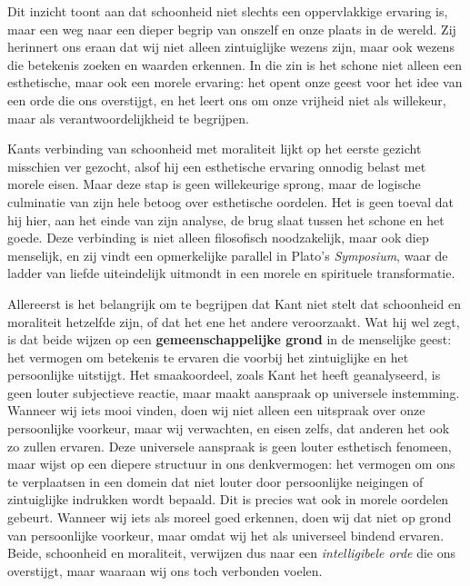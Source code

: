 \begin{mdframed}[leftmargin=0pt,rightmargin=0pt,backgroundcolor=blue!6,linecolor=white,innertopmargin=6pt,innerbottommargin=6pt]
Dit inzicht toont aan dat schoonheid niet slechts een oppervlakkige ervaring is, maar een weg naar een dieper begrip van onszelf en onze plaats in de wereld. Zij herinnert ons eraan dat wij niet alleen zintuiglijke wezens zijn, maar ook wezens die betekenis zoeken en waarden erkennen. In die zin is het schone niet alleen een esthetische, maar ook een morele ervaring: het opent onze geest voor het idee van een orde die ons overstijgt, en het leert ons om onze vrijheid niet als willekeur, maar als verantwoordelijkheid te begrijpen.

\bigskip
Kants verbinding van schoonheid met moraliteit lijkt op het eerste gezicht misschien ver gezocht, alsof hij een esthetische ervaring onnodig belast met morele eisen. Maar deze stap is geen willekeurige sprong, maar de logische culminatie van zijn hele betoog over esthetische oordelen. Het is geen toeval dat hij hier, aan het einde van zijn analyse, de brug slaat tussen het schone en het goede. Deze verbinding is niet alleen filosofisch noodzakelijk, maar ook diep menselijk, en zij vindt een opmerkelijke parallel in Plato's \textit{Symposium}, waar de ladder van liefde uiteindelijk uitmondt in een morele en spirituele transformatie.

Allereerst is het belangrijk om te begrijpen dat Kant niet stelt dat schoonheid en moraliteit hetzelfde zijn, of dat het ene het andere veroorzaakt. Wat hij wel zegt, is dat beide wijzen op een \textbf{gemeenschappelijke grond} in de menselijke geest: het vermogen om betekenis te ervaren die voorbij het zintuiglijke en het persoonlijke uitstijgt. Het smaakoordeel, zoals Kant het heeft geanalyseerd, is geen louter subjectieve reactie, maar maakt aanspraak op universele instemming. Wanneer wij iets mooi vinden, doen wij niet alleen een uitspraak over onze persoonlijke voorkeur, maar wij verwachten, en eisen zelfs, dat anderen het ook zo zullen ervaren. Deze universele aanspraak is geen louter esthetisch fenomeen, maar wijst op een diepere structuur in ons denkvermogen: het vermogen om ons te verplaatsen in een domein dat niet louter door persoonlijke neigingen of zintuiglijke indrukken wordt bepaald. Dit is precies wat ook in morele oordelen gebeurt. Wanneer wij iets als moreel goed erkennen, doen wij dat niet op grond van persoonlijke voorkeur, maar omdat wij het als universeel bindend ervaren. Beide, schoonheid en moraliteit, verwijzen dus naar een \textit{intelligibele orde} die ons overstijgt, maar waaraan wij ons toch verbonden voelen.


\end{mdframed}
